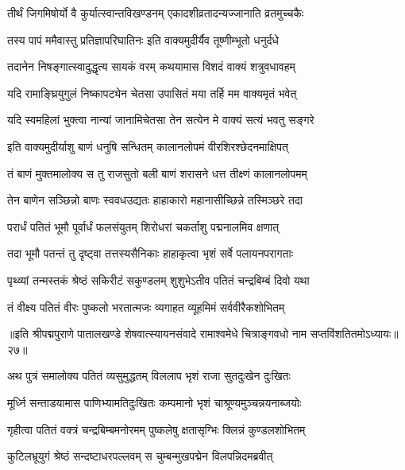 \twolineshloka
{तीर्थं जिगमिषोर्यो वै कुर्यात्स्वान्तविखण्डनम्}
{एकादशीव्रतादन्यज्जानाति व्रतमुच्चकैः}%

\twolineshloka
{तस्य पापं ममैवास्तु प्रतिज्ञापरिघातिनः}
{इति वाक्यमुदीर्यैव तूष्णीम्भूतो धनुर्दधे}%

\twolineshloka
{तदानेन निषङ्गात्स्वादुद्धृत्य सायकं वरम्}
{कथयामास विशदं वाक्यं शत्रुवधावहम्}%


\twolineshloka
{यदि रामाङ्घ्रियुगुलं निष्कापट्येन चेतसा}
{उपासितं मया तर्हि मम वाक्यमृतं भवेत्}%

\twolineshloka
{यदि स्वमहिलां भुक्त्वा नान्यां जानामिचेतसा}
{तेन सत्येन मे वाक्यं सत्यं भवतु सङ्गरे}%

\twolineshloka
{इति वाक्यमुदीर्याशु बाणं धनुषि सन्धितम्}
{कालानलोपमं वीरशिरश्छेदनमाक्षिपत्}%

\twolineshloka
{तं बाणं मुक्तमालोक्य स तु राजसुतो बली}
{बाणं शरासने धत्त तीक्ष्णं कालानलोपमम्}%

\twolineshloka
{तेन बाणेन सञ्छिन्नो बाणः स्ववधउद्यतः}
{हाहाकारो महानासीच्छिन्ने तस्मिञ्छरे तदा}%

\twolineshloka
{परार्धं पतितं भूमौ पूर्वार्धं फलसंयुतम्}
{शिरोधरां चकर्ताशु पद्मनालमिव क्षणात्}%

\twolineshloka
{तदा भूमौ पतन्तं तु दृष्ट्वा तत्तस्यसैनिकाः}
{हाहाकृत्वा भृशं सर्वे पलायनपरागताः}%

\twolineshloka
{पृथ्व्यां तन्मस्तकं श्रेष्ठं सकिरीटं सकुण्डलम्}
{शुशुभेऽतीव पतितं चन्द्रबिम्बं दिवो यथा}%

\twolineshloka
{तं वीक्ष्य पतितं वीरः पुष्कलो भरतात्मजः}
{व्यगाहत व्यूहमिमं सर्ववीरैकशोभितम्}%

{॥इति श्रीपद्मपुराणे पातालखण्डे शेषवात्स्यायनसंवादे रामाश्वमेधे चित्राङ्गवधो नाम सप्तविंशतितमोऽध्यायः॥२७॥}



\twolineshloka
{अथ पुत्रं समालोक्य पतितं व्यसुमुद्धतम्}
{विललाप भृशं राजा सुतदुःखेन दुःखितः}%

\twolineshloka
{मूर्ध्नि सन्ताडयामास पाणिभ्यामतिदुःखितः}
{कम्पमानो भृशं चाश्रूण्यमुञ्चन्नयनाब्जयोः}%

\twolineshloka
{गृहीत्वा पतितं वक्त्रं चन्द्रबिम्बमनोरमम्}
{पुष्कलेषु क्षतासृग्भिः क्लिन्नं कुण्डलशोभितम्}%

\twolineshloka
{कुटिलभ्रूयुगं श्रेष्ठं सन्दष्टाधरपल्लवम्}
{स चुम्बन्मुखपद्मेन विलपन्निदमब्रवीत्}%

